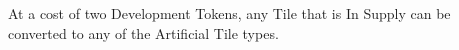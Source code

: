 At a cost of two Development Tokens, any Tile that is In Supply can be converted to any of the Artificial Tile types.
